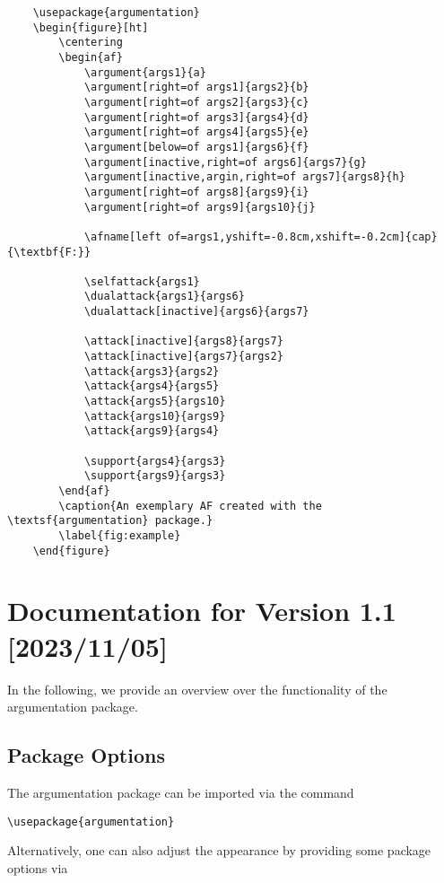 \documentclass{article}
\begin{document}
\begin{verbatim}
    \usepackage{argumentation}
    \begin{figure}[ht]
        \centering
        \begin{af}
            \argument{args1}{a}
            \argument[right=of args1]{args2}{b}
            \argument[right=of args2]{args3}{c}
            \argument[right=of args3]{args4}{d}
            \argument[right=of args4]{args5}{e}
            \argument[below=of args1]{args6}{f}
            \argument[inactive,right=of args6]{args7}{g}
            \argument[inactive,argin,right=of args7]{args8}{h}
            \argument[right=of args8]{args9}{i}
            \argument[right=of args9]{args10}{j}
    
            \afname[left of=args1,yshift=-0.8cm,xshift=-0.2cm]{cap}{\textbf{F:}}
    
            \selfattack{args1}
            \dualattack{args1}{args6}
            \dualattack[inactive]{args6}{args7}
            
            \attack[inactive]{args8}{args7}
            \attack[inactive]{args7}{args2}
            \attack{args3}{args2}    
            \attack{args4}{args5}
            \attack{args5}{args10}
            \attack{args10}{args9}
            \attack{args9}{args4}

            \support{args4}{args3}
            \support{args9}{args3}
        \end{af}
        \caption{An exemplary AF created with the \textsf{argumentation} package.}
        \label{fig:example}
    \end{figure}
\end{verbatim}

\section{Documentation for Version 1.1 [2023/11/05]}
In the following, we provide an overview over the functionality of the \textsf{argumentation} package.

\subsection{Package Options}
    The \textsf{argumentation} package can be imported via the command
    
    \noindent
    \verb|\usepackage{argumentation}|

    Alternatively, one can also adjust the appearance by providing some package options via
\end{document}
